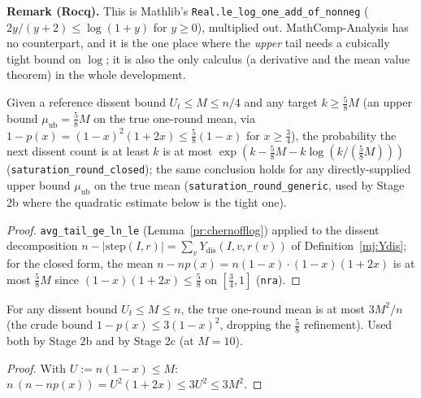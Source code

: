 \noindent\textbf{Remark (Rocq).} This is Mathlib's
\texttt{Real.le\_log\_one\_add\_of\_nonneg} ($2y/(y+2) \le \log(1+y)$ for
$y \ge 0$), multiplied out. MathComp-Analysis has no counterpart, and it is
the one place where the \emph{upper} tail needs a cubically tight bound on
$\log$; it is also the only calculus (a derivative and the mean value
theorem) in the whole development.

\begin{lemma}\label{mj:satclosed}
  \rocqok
  Given a reference dissent bound $U_t\le M\le n/4$ and any target
  $k\ge\tfrac58M$ (an upper bound $\mu_{\mathrm{ub}}=\tfrac58M$ on the true
  one-round mean, via $1-p(x)=(1-x)^2(1+2x)\le\tfrac58(1-x)$ for
  $x\ge\tfrac34$), the probability the next dissent count is at least $k$ is
  at most $\exp(k-\tfrac58M-k\log(k/(\tfrac58M)))$
  (\texttt{saturation\_round\_closed}); the same conclusion holds for any
  directly-supplied upper bound $\mu_{\mathrm{ub}}$ on the true mean
  (\texttt{saturation\_round\_generic}, used by Stage 2b where the
  quadratic estimate below is the tight one).
\end{lemma}
\begin{proof}
  \rocqok
  \texttt{avg\_tail\_ge\_ln\_le} (Lemma~\ref{pr:chernofflog}) applied to the
  dissent decomposition $n - |\mathrm{step}(I,r)| = \sum_v
  Y_{\mathrm{dis}}(I,v,r(v))$ of Definition~\ref{mj:Ydis}; for the closed
  form, the mean $n - n p(x) = n(1-x)\cdot(1-x)(1+2x)$ is at most
  $\tfrac58 M$ since $(1-x)(1+2x) \le \tfrac58$ on $[\tfrac34, 1]$
  (\texttt{nra}).
\end{proof}

\begin{lemma}\label{mj:satquad}
  \rocqok
  For any dissent bound $U_t\le M\le n$, the true one-round mean is at most
  $3M^2/n$ (the crude bound $1-p(x)\le3(1-x)^2$, dropping the $\tfrac58$
  refinement). Used both by Stage 2b and by Stage 2c (at $M=10$).
\end{lemma}
\begin{proof}
  \rocqok
  With $U := n(1-x) \le M$: $n\,(n - np(x)) = U^2(1+2x) \le 3U^2 \le 3M^2$.
\end{proof}

